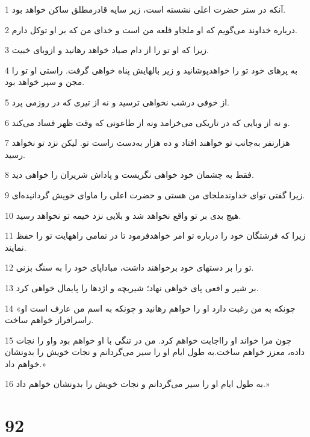 \par 1 آنکه در ستر حضرت اعلی نشسته است، زیر سایه قادرمطلق ساکن خواهد بود.
\par 2 درباره خداوند می‌گویم که او ملجاو قلعه من است و خدای من که بر او توکل دارم.
\par 3 زیرا که او تو را از دام صیاد خواهد رهانید و ازوبای خبیث.
\par 4 به پرهای خود تو را خواهدپوشانید و زیر بالهایش پناه خواهی گرفت. راستی او تو را مجن و سپر خواهد بود.
\par 5 از خوفی درشب نخواهی ترسید و نه از تیری که در روزمی پرد.
\par 6 و نه از وبایی که در تاریکی می‌خرامد ونه از طاعونی که وقت ظهر فساد می‌کند.
\par 7 هزارنفر به‌جانب تو خواهند افتاد و ده هزار به‌دست راست تو. لیکن نزد تو نخواهد رسید.
\par 8 فقط به چشمان خود خواهی نگریست و پاداش شریران را خواهی دید.
\par 9 زیرا گفتی تو‌ای خداوندملجای من هستی و حضرت اعلی را ماوای خویش گردانیده‌ای.
\par 10 هیچ بدی بر تو واقع نخواهد شد و بلایی نزد خیمه تو نخواهد رسید.
\par 11 زیرا که فرشتگان خود را درباره تو امر خواهدفرمود تا در تمامی راههایت تو را حفظ نمایند.
\par 12 تو را بر دستهای خود برخواهند داشت، مباداپای خود را به سنگ بزنی.
\par 13 بر شیر و افعی پای خواهی نهاد؛ شیربچه و اژدها را پایمال خواهی کرد.
\par 14 «چونکه به من رغبت دارد او را خواهم رهانید و چونکه به اسم من عارف است او راسرافراز خواهم ساخت.
\par 15 چون مرا خواند او رااجابت خواهم کرد. من در تنگی با او خواهم بود واو را نجات داده، معزز خواهم ساخت.به طول ایام او را سیر می‌گردانم و نجات خویش را بدونشان خواهم داد.»
\par 16 به طول ایام او را سیر می‌گردانم و نجات خویش را بدونشان خواهم داد.»
 
\chapter{92}

